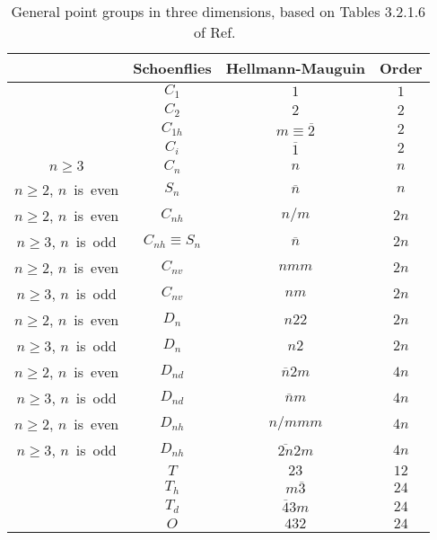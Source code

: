 \documentclass[a4paper, 11pt]{article}
\theoremstyle{definition}
\begin{document}
\begin{table}[tb]
  \centering
  \caption{
    General point groups in three dimensions, based on Tables 3.2.1.6 of Ref.~\cite{hahn2016point}
  }
  \label{tab:point_groups}
  \begin{tabular}{cccc}
    \hline \hline
    & Schoenflies & Hellmann-Mauguin & Order \\
    \hline
    & $C_{1}$ & $1$                     & $1$ \\
    & $C_{2}$ & $2$                     & $2$ \\
    & $C_{1h}$ & $m \equiv \overline{2}$ & $2$ \\
    & $C_{i}$ & $\overline{1}$          & $2$ \\
    \hline
    $n \geq 3$                     & $C_{n}$               & $n$            & $n$ \\
    $n \geq 2$, \mbox{$n$ is even} & $S_{n}$               & $\overline{n}$ & $n$ \\
    $n \geq 2$, \mbox{$n$ is even} & $C_{nh}$              & $n / m$        & $2n$ \\
    $n \geq 3$, \mbox{$n$ is odd}  & $C_{nh} \equiv S_{n}$ & $\overline{n}$ & $2n$ \\
    $n \geq 2$, \mbox{$n$ is even} & $C_{nv}$              & $nmm$          & $2n$ \\
    $n \geq 3$, \mbox{$n$ is odd}  & $C_{nv}$              & $nm$           & $2n$ \\
    \hline
    $n \geq 2$, \mbox{$n$ is even} & $D_{n}$  & $n22$             & $2n$ \\
    $n \geq 3$, \mbox{$n$ is odd}  & $D_{n}$  & $n2$              & $2n$ \\
    $n \geq 2$, \mbox{$n$ is even} & $D_{nd}$ & $\overline{n}2m$  & $4n$ \\
    $n \geq 3$, \mbox{$n$ is odd}  & $D_{nd}$ & $\overline{n}m$   & $4n$ \\
    $n \geq 2$, \mbox{$n$ is even} & $D_{nh}$ & $n/mmm$           & $4n$ \\
    $n \geq 3$, \mbox{$n$ is odd}  & $D_{nh}$ & $\overline{2n}2m$ & $4n$ \\
    \hline
    & $T$     & $23$             & $12$ \\
    & $T_{h}$ & $m\overline{3}$  & $24$ \\
    & $T_{d}$ & $\overline{4}3m$ & $24$ \\
    & $O$     & $432$            & $24$ \\

\end{tabular}
\end{table}
\end{document}
